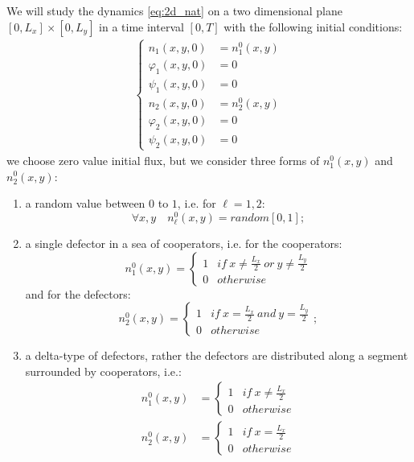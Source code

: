 We will study the dynamics \ref{eq:2d_nat} on a two dimensional plane
$\left[0,L_{x}\right]\times\left[0,L_{y}\right]$ in a time interval
$\left[0,T\right]$ with the following initial conditions:
\begin{align*}
\begin{cases}
n_{1}\left(x,y,0\right) & =n_{1}^{0}\left(x,y\right)\\
\varphi_{1}\left(x,y,0\right) & =0\\
\psi_{1}\left(x,y,0\right) & =0\\
n_{2}\left(x,y,0\right) & =n_{2}^{0}\left(x,y\right)\\
\varphi_{2}\left(x,y,0\right) & =0\\
\psi_{2}\left(x,y,0\right) & =0
\end{cases}
\end{align*}
we choose zero value initial flux, but we consider three forms of
$n_{1}^{0}\left(x,y\right)$ and $n_{2}^{0}\left(x,y\right)$:
\begin{enumerate}
\item a random value between $0$ to $1$, i.e. for $\ell=1,2$:
\[
\forall x,y\quad n_{\ell}^{0}\left(x,y\right)=random\left[0,1\right];
\]
\item a single defector in a sea of cooperators, i.e. for the cooperators:
\[
n_{1}^{0}\left(x,y\right)=\begin{cases}
1 & if\ x\neq\frac{L_{x}}{2}\ or\ y\neq\frac{L_{y}}{2}\\
0 & otherwise
\end{cases}
\]
 and for the defectors:
\[
n_{2}^{0}\left(x,y\right)=\begin{cases}
1 & if\ x=\frac{L_{x}}{2}\ and\ y=\frac{L_{y}}{2}\\
0 & otherwise
\end{cases};
\]
\item a delta-type of defectors, rather the defectors are distributed along
a segment surrounded by cooperators, i.e.:
\begin{align*}
n_{1}^{0}\left(x,y\right) & =\begin{cases}
1 & if\ x\neq\frac{L_{x}}{2}\\
0 & otherwise
\end{cases}\\
n_{2}^{0}\left(x,y\right) & =\begin{cases}
1 & if\ x=\frac{L_{x}}{2}\\
0 & otherwise
\end{cases}
\end{align*}
\end{enumerate}

